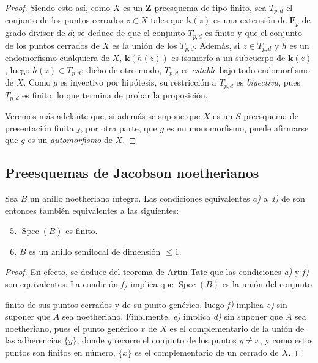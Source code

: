 \begin{proof}
Siendo esto así, como $X$ es un $\mathbf Z$-preesquema de tipo finito, sea $T_{p,d}$ el conjunto de los puntos cerrados $z\in X$ tales que $\boldsymbol{k}(z)$ es una extensión de $\mathbf F_p$ de grado divisor de $d$; se deduce de  que el conjunto $T_{p,d}$ es finito y que el conjunto de los puntos cerrados de $X$ es la unión de los $T_{p,d}$.
Además, si $z\in T_{p,d}$ y $h$ es un endomorfismo cualquiera de $X$, $\boldsymbol{k}(h(z))$ es isomorfo a un subcuerpo de $\boldsymbol{k}(z)$, luego $h(z)\in T_{p,d}$; dicho de otro modo, $T_{p,d}$ es \emph{estable} bajo todo endomorfismo de $X$.
Como $g$ es inyectivo por hipótesis, su restricción a $T_{p,d}$ es \emph{biyectiva}, pues $T_{p,d}$ es finito, lo que termina de probar la proposición.

Veremos más adelante  que, si además se supone que $X$ es un $S$-preesquema de presentación finita y, por otra parte, que $g$ es un monomorfismo, puede afirmarse que $g$ es un \emph{automorfismo} de $X$.
\end{proof}

\subsection{Preesquemas de Jacobson noetherianos}
\label{subsection:IV.10.5}

\begin{proposition}[10.5.1]
\label{IV.10.5.1}
Sea $B$ un anillo noetheriano íntegro.
Las condiciones equivalentes \emph{a)} a \emph{d)} de  son entonces también equivalentes a las siguientes:
\begin{enumerate}[label=\alph*)]
  \setcounter{enumi}{4}
  \item $\operatorname{Spec}(B)$ es finito.
  \item $B$ es un anillo semilocal de dimensión $\leq1$.
\end{enumerate}
\end{proposition}

\begin{proof}

En efecto, se deduce del teorema de Artin-Tate  que las condiciones \emph{a)} y \emph{f)} son equivalentes.
La condición \emph{f)} implica que $\operatorname{Spec}(B)$ es la unión del conjunto 


finito de sus puntos cerrados y de su punto genérico, luego \emph{f)} implica \emph{e)} sin suponer que $A$ sea noetheriano.
Finalmente, \emph{e)} implica \emph{d)} sin suponer que $A$ sea noetheriano, pues el punto genérico $x$ de $X$ es el complementario de la unión de las adherencias $\overline{\{y\}}$, donde $y$ recorre el conjunto de los puntos $y\neq x$, y como estos puntos son finitos en número, $\{x\}$ es el complementario de un cerrado de $X$.
\end{proof}

